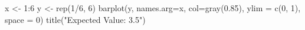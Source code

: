 \begin{Schunk}
\begin{Sinput}
 x <- 1:6
 y <- rep(1/6, 6)
 barplot(y, names.arg=x, col=gray(0.85), ylim = c(0, 1), space = 0)
 title("Expected Value: 3.5")
\end{Sinput}
\end{Schunk}
